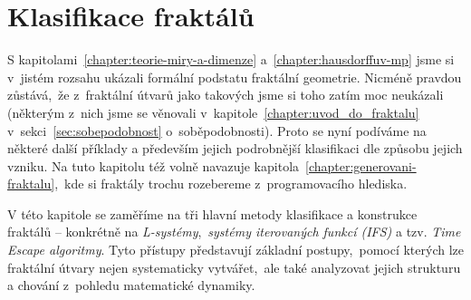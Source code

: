 \chapter{Klasifikace fraktálů}\label{chapter:klasifikace-fraktalu}

S kapitolami~\ref{chapter:teorie-miry-a-dimenze} a~\ref{chapter:hausdorffuv-mp} jsme si v~jistém rozsahu ukázali formální podstatu fraktální geometrie. Nicméně pravdou zůstává,~že z~fraktální útvarů jako takových jsme si toho zatím moc neukázali (některým z~nich jsme se věnovali v~kapitole~\ref{chapter:uvod_do_fraktalu} v~sekci~\ref{sec:sobepodobnost} o~soběpodobnosti). Proto se nyní podíváme na některé další příklady a především jejich podrobnější klasifikaci dle způsobu jejich vzniku. Na tuto kapitolu též volně navazuje kapitola~\ref{chapter:generovani-fraktalu},~kde si fraktály trochu rozebereme z~programovacího hlediska.

V této kapitole se zaměříme na tři hlavní metody klasifikace a konstrukce fraktálů -- konkrétně na \emph{L-systémy},~\emph{systémy iterovaných funkcí (IFS)} a tzv. \emph{Time Escape algoritmy}. Tyto přístupy představují základní postupy,~pomocí kterých lze fraktální útvary nejen systematicky vytvářet,~ale také analyzovat jejich strukturu a chování z~pohledu matematické dynamiky.




